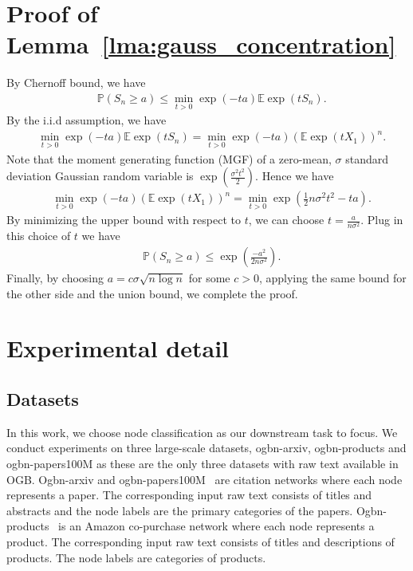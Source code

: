 \documentclass{article} \usepackage{iclr2022_conference,times}
\begin{document}
\section{Proof of Lemma~\ref{lma:gauss_concentration}}
By Chernoff bound, we have
\begin{align}
	& \mathbb{P}\left(S_n \geq a\right) \leq \min_{t>0}\exp(-ta)\mathbb{E}\exp(tS_n).
\end{align}
By the i.i.d assumption, we have
\begin{align}
	& \min_{t>0}\exp(-ta)\mathbb{E}\exp(tS_n) = \min_{t>0}\exp(-ta)(\mathbb{E}\exp(tX_1))^n.
\end{align}
Note that the moment generating function (MGF) of a zero-mean, $\sigma$ standard deviation Gaussian random variable is $\exp(\frac{\sigma^2t^2}{2})$. Hence we have
\begin{align}
	& \min_{t>0}\exp(-ta)(\mathbb{E}\exp(tX_1))^n = \min_{t>0}\exp(\frac{1}{2}n\sigma^2t^2-ta).
\end{align}
By minimizing the upper bound with respect to $t$, we can choose $t=\frac{a}{n\sigma^2}$. Plug in this choice of $t$ we have
\begin{align}
	& \mathbb{P}\left(S_n \geq a\right) \leq \exp(\frac{-a^2}{2n\sigma^2}).
\end{align}
Finally, by choosing $a=c\sigma \sqrt{n\log n}$ for some $c>0$, applying the same bound for the other side and the union bound, we complete the proof.


\section{Experimental detail}

\subsection{Datasets}
\label{apx:exp-data}



In this work, we choose node classification as our downstream task to focus. We conduct experiments on three large-scale datasets, ogbn-arxiv, ogbn-products and ogbn-papers100M as these are the only three datasets with raw text available in OGB. Ogbn-arxiv and ogbn-papers100M~\citep{wang2020microsoft,hu2020open} are citation networks where each node represents a paper. The corresponding input raw text consists of titles and abstracts and the node labels are the primary categories of the papers. Ogbn-products~\citep{chiang2019cluster,hu2020open} is an Amazon co-purchase network where each node represents a product. The corresponding input raw text consists of titles and descriptions of products. The node labels are categories of products. 
\end{document}
